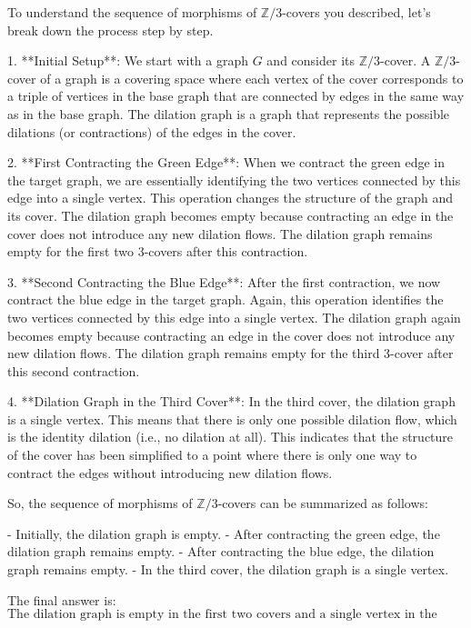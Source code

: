 To understand the sequence of morphisms of \(\mathbb{Z}/3\)-covers you described, let's break down the process step by step.

1. **Initial Setup**: We start with a graph \(G\) and consider its \(\mathbb{Z}/3\)-cover. A \(\mathbb{Z}/3\)-cover of a graph is a covering space where each vertex of the cover corresponds to a triple of vertices in the base graph that are connected by edges in the same way as in the base graph. The dilation graph is a graph that represents the possible dilations (or contractions) of the edges in the cover.

2. **First Contracting the Green Edge**: When we contract the green edge in the target graph, we are essentially identifying the two vertices connected by this edge into a single vertex. This operation changes the structure of the graph and its cover. The dilation graph becomes empty because contracting an edge in the cover does not introduce any new dilation flows. The dilation graph remains empty for the first two 3-covers after this contraction.

3. **Second Contracting the Blue Edge**: After the first contraction, we now contract the blue edge in the target graph. Again, this operation identifies the two vertices connected by this edge into a single vertex. The dilation graph again becomes empty because contracting an edge in the cover does not introduce any new dilation flows. The dilation graph remains empty for the third 3-cover after this second contraction.

4. **Dilation Graph in the Third Cover**: In the third cover, the dilation graph is a single vertex. This means that there is only one possible dilation flow, which is the identity dilation (i.e., no dilation at all). This indicates that the structure of the cover has been simplified to a point where there is only one way to contract the edges without introducing new dilation flows.

So, the sequence of morphisms of \(\mathbb{Z}/3\)-covers can be summarized as follows:

- Initially, the dilation graph is empty.
- After contracting the green edge, the dilation graph remains empty.
- After contracting the blue edge, the dilation graph remains empty.
- In the third cover, the dilation graph is a single vertex.

The final answer is:
\[
\boxed{\text{The dilation graph is empty in the first two covers and a single vertex in the third cover.}}
\]